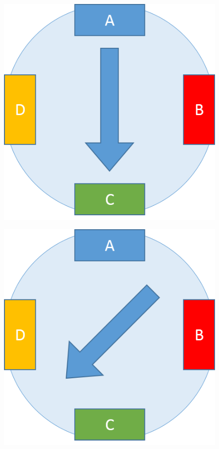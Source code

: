 \documentclass[table,10pt,red]{beamer}	%
\begin{document}
\begin{frame}
\begin{minipage}[c]{0.24\textwidth}
\begin{figure}
		\end{figure}
	\end{minipage}
	\begin{minipage}[c]{0.24\textwidth}
		\begin{figure}
			\includegraphics[width=0.9\linewidth]{step5}
		\end{figure}
	\end{minipage}
	\begin{minipage}[c]{0.24\textwidth}
		\begin{figure}
			\includegraphics[width=0.9\linewidth]{step6}

\end{figure}
\end{minipage}
\end{frame}
\end{document}
